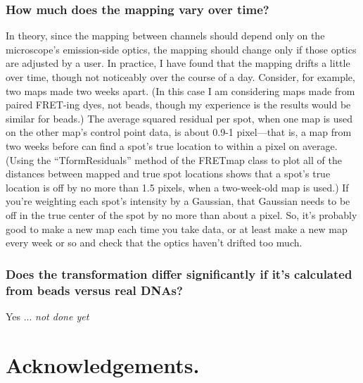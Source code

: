 \documentclass[11pt]{article}
\begin{document}
\subsubsection{How much does the mapping vary over time?}

In theory, since the mapping between channels should depend only on the microscope's emission-side optics, the mapping should change only if those optics are adjusted by a user.  In practice, I have found that the mapping drifts a little over time, though not noticeably over the course of a day.  Consider, for example, two maps made two weeks apart.  (In this case I am considering maps made from paired FRET-ing dyes, not beads, though my experience is the results would be similar for beads.)  The average squared residual per spot, when one map is used on the other map's control point data, is about 0.9-1 pixel---that is, a map from two weeks before can find a spot's true location to within a pixel on average.  (Using the ``TformResiduals'' method of the FRETmap class to plot all of the distances between mapped and true spot locations shows that a spot's true location is off by no more than 1.5 pixels, when a two-week-old map is used.)  If you're weighting each spot's intensity by a Gaussian, that Gaussian needs to be off in the true center of the spot by no more than about a pixel.  So, it's probably good to make a new map each time you take data, or at least make a new map every week or so and check that the optics haven't drifted too much.

\subsubsection{Does the transformation differ significantly if it's calculated from beads versus real DNAs?}

Yes ... {\it not done yet}

\newpage

\section{Acknowledgements.}
\end{document}
